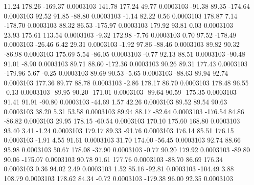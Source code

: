        11.24      178.26     -169.37     0.0003103
      141.78      177.24       49.77     0.0003103
      -91.38       89.35     -174.64     0.0003103
       92.52       91.85      -88.80     0.0003103
       -1.14       82.22        0.56     0.0003103
      178.87        7.14     -178.70     0.0003103
       88.32       86.53     -175.97     0.0003103
      179.92       93.81        0.03     0.0003103
       23.93      175.61      113.54     0.0003103
       -9.32      172.98       -7.76     0.0003103
        0.70       97.52     -178.49     0.0003103
      -26.46        6.42       29.31     0.0003103
       -1.92       97.86      -88.46     0.0003103
       89.82       90.32      -86.98     0.0003103
      175.69        5.54      -86.05     0.0003103
       -0.77       92.13       88.51     0.0003103
      -90.48       91.01       -8.90     0.0003103
       89.71       88.60     -172.36     0.0003103
       90.26       89.31      177.43     0.0003103
     -179.96        5.67       -0.25     0.0003103
       89.69       90.53       -5.65     0.0003103
      -88.63       89.94       92.74     0.0003103
      177.36       89.77       88.78     0.0003103
       -2.86      178.17       86.70     0.0003103
      178.48       96.55       -0.13     0.0003103
      -89.95       90.20     -171.01     0.0003103
      -89.64       90.59     -175.35     0.0003103
       91.41       91.91      -90.80     0.0003103
      -44.69        1.57       42.26     0.0003103
       89.52       89.54       90.63     0.0003103
       38.20        5.31       53.58     0.0003103
       89.94       88.17      -82.64     0.0003103
     -176.54       84.86      -86.82     0.0003103
       29.95      178.15      -60.54     0.0003103
      170.10      175.60      168.80     0.0003103
       93.40        3.41       -1.24     0.0003103
      179.17       89.33      -91.76     0.0003103
      176.14       85.51      176.15     0.0003103
       -1.91        4.55       91.61     0.0003103
       31.70      174.00      -56.45     0.0003103
       92.74       88.66       95.98     0.0003103
       50.67      178.08      -37.90     0.0003103
       -0.77       90.20      179.92     0.0003103
      -89.80       90.06     -175.07     0.0003103
       90.78       91.61      177.76     0.0003103
      -88.70       86.69      176.34     0.0003103
        0.36       94.02        2.49     0.0003103
        1.52       85.16      -92.81     0.0003103
     -104.49        3.88      108.79     0.0003103
      178.62       84.34       -0.72     0.0003103
     -179.38       96.00       92.35     0.0003103
